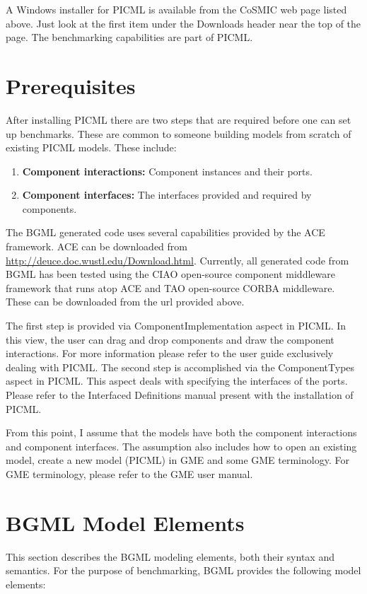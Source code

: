 \documentclass[onecolumn]{article}
\begin{document}
A Windows installer for PICML is available from the CoSMIC web page
listed above. Just look at the first item under the Downloads header
near the top of the page. The benchmarking capabilities are part of
PICML.

\section* {Prerequisites}
After installing PICML there are two steps that are
required before one can set up benchmarks.  These are common to
someone building models from scratch of existing PICML models. These
include:
\sqztiny
\begin{enumerate}\crunchlist
\item {\bf Component interactions:} Component instances and their ports.
\item {\bf Component interfaces:} The interfaces provided and required by
components.
\end{enumerate}

\noindent The BGML generated code uses several capabilities provided
by the ACE framework. ACE can be downloaded from
\url{http://deuce.doc.wustl.edu/Download.html}. Currently, all
generated code from BGML has been tested using the CIAO open-source
component middleware framework that runs atop ACE and TAO open-source
CORBA middleware. These can be downloaded from the url provided above.

\noindent The first step is provided via ComponentImplementation aspect in
PICML. In this view, the user can drag and drop components and draw
the component interactions. For more information please refer to the
user guide exclusively dealing with PICML. The second step is accomplished via
the ComponentTypes aspect in PICML. This aspect deals with specifying
the interfaces of the ports. Please refer to the Interfaced
Definitions manual present with the installation of PICML.

From this point, I assume that the models have both the component
interactions and component interfaces.  The assumption also includes
how to open an existing model, create a new model (PICML) in GME and
some GME terminology. For GME terminology, please refer to the GME
user manual.

\section*{BGML Model Elements}

This section describes the BGML modeling elements, both their syntax
and semantics. For the purpose of benchmarking, BGML provides the
following model elements:
\end{document}
